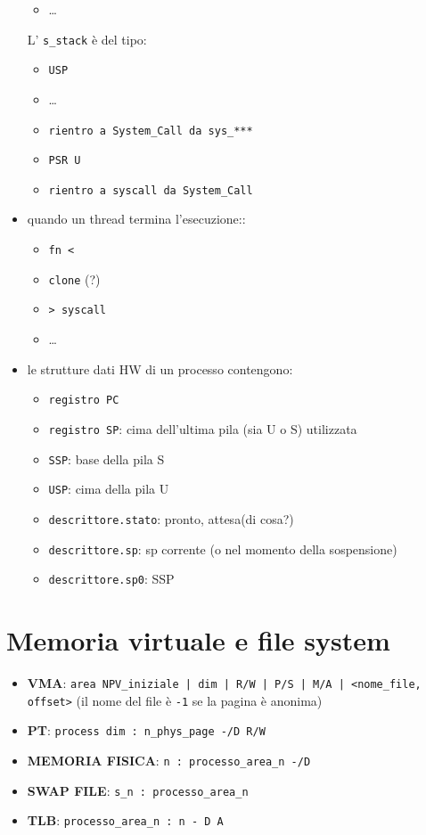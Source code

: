 \documentclass[12pt, a4paper]{report}
\begin{document}
\begin{itemize}
\begin{itemize}
		      \item \dots
	      \end{itemize}
	      L' \texttt{s\_stack} è del tipo:
	      \begin{itemize}
		      \item \texttt{USP}
		      \item \dots
		      \item \texttt{rientro a System\_Call da sys\_***}
		      \item \texttt{PSR U}
		      \item \texttt{rientro a syscall da System\_Call}
	      \end{itemize}
	\item quando un thread termina l'esecuzione::
	      \begin{itemize}
		      \item \texttt{fn <}
		      \item \texttt{clone} (?) %
		      \item \texttt{> syscall}
		      \item \dots
	      \end{itemize}
	\item le strutture dati HW di un processo contengono:
	      \begin{itemize}
		      \item \texttt{registro PC}
		      \item \texttt{registro SP}: cima dell'ultima pila (sia U o S)
		            utilizzata
		      \item \texttt{SSP}: base della pila S
		      \item \texttt{USP}: cima della pila U
		      \item \texttt{descrittore.stato}: pronto, attesa(di cosa?)
		      \item \texttt{descrittore.sp}: sp corrente (o nel momento della
				  sospensione)
		      \item \texttt{descrittore.sp0}: SSP
	      \end{itemize}
\end{itemize}


\newpage
\section*{Memoria virtuale e file system}

\begin{itemize}
	\item \textbf{VMA}: \texttt{area NPV\_iniziale | dim | R/W | P/S | M/A |
		      <nome\_file, offset>}
	      (il nome del file è \texttt{-1} se la pagina è anonima)
	\item \textbf{PT}: \texttt{process dim : n\_phys\_page -/D R/W}
	\item \textbf{MEMORIA FISICA}: \texttt{n : processo\_area\_n -/D}
	\item \textbf{SWAP FILE}: \texttt{s\_n : processo\_area\_n}
	\item \textbf{TLB}: \texttt{processo\_area\_n : n - D A}
\end{itemize}
\end{document}

